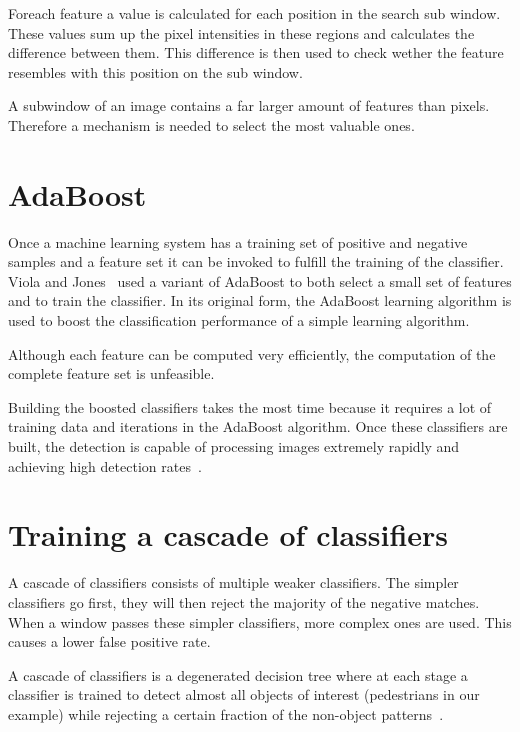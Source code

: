 \documentclass{article}
\begin{document}
\par
Foreach feature a value is calculated for each position in the search sub window. These values sum up the pixel intensities in these regions and calculates the difference between them. This difference is then used to check wether the feature resembles with this position on the sub window.

\par
A subwindow of an image contains a far larger amount of features than pixels. Therefore a mechanism is needed to select the most valuable ones.

\section{AdaBoost}

Once a machine learning system has a training set of positive and negative samples and a feature set it can be invoked to fulfill the training of the classifier. Viola and Jones~\cite{viola2001rapid} used a variant of AdaBoost to both select a small set of features and to train the classifier. In its original form, the AdaBoost learning algorithm is used to boost the classification performance of a simple  learning algorithm.

\par
Although each feature can be computed very efficiently, the computation of the complete feature set is unfeasible.

\par
Building the boosted classifiers takes the most time because it requires a lot of training data and iterations in the AdaBoost algorithm. Once these classifiers are built, the detection is capable of processing images extremely rapidly and achieving high detection rates~\cite{viola2001rapid}.

\section{Training a cascade of classifiers}

A cascade of classifiers consists of multiple weaker classifiers. The simpler classifiers go first, they will then reject the majority of the negative matches. When a window passes these simpler classifiers, more complex ones are used. This causes a lower false positive rate.

A cascade of classifiers is a degenerated decision tree where at each stage a classifier is trained to detect almost all objects of interest (pedestrians in our example) while rejecting a certain fraction of the non-object patterns~\cite{viola2001rapid}.
\end{document}
